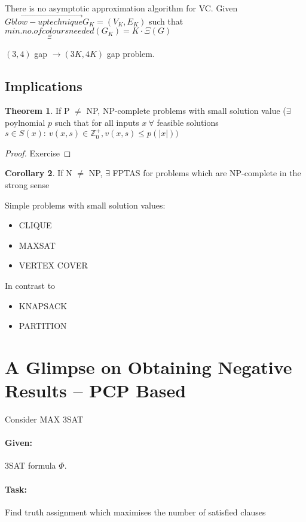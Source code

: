 \documentclass[11pt]{article}
\theoremstyle{definition}
\newtheorem{theorem}{Theorem}[section]
\newtheorem{corollary}[theorem]{Corollary}
\theoremstyle{definition}
\begin{document}
There is no asymptotic approximation algorithm for VC. Given $ G \overset{\rightarrow}{blow-up technique} G_K = (V_K, E_K) $ such that $ \underset{\Xi}{min. no. of colours needed}(G_K) = K \cdot \Xi(G) $

$ (3, 4) $ gap $ \rightarrow (3K, 4K) $ gap problem.

\subsection{Implications}

\begin{theorem}
If P $ \neq $ NP, NP-complete problems with small solution value ($ \exists $ poylnomial $ p $ such that for all inputs $ x ~\forall $ feasible solutions $ s \in S(x) : ~ v(x, s) \in \mathbb{Z}_0^+, v(x, s) \leq p(|x|) )$ 
\end{theorem}

\begin{proof}
Exercise
\end{proof}

\begin{corollary}
If N $ \neq $ NP, $ \exists $ FPTAS for problems which are NP-complete in the strong sense 
\end{corollary}

Simple problems with small solution values:
\begin{itemize}
\item CLIQUE
\item MAXSAT
\item VERTEX COVER
\end{itemize} \medskip

In contrast to
\begin{itemize}
\item KNAPSACK
\item PARTITION
\end{itemize}

\section{A Glimpse on Obtaining Negative Results – PCP Based}

Consider MAX 3SAT
\paragraph{Given:} 3SAT formula $ \Phi $.
\paragraph{Task:} Find truth assignment which maximises the number of satisfied clauses
\end{document}
